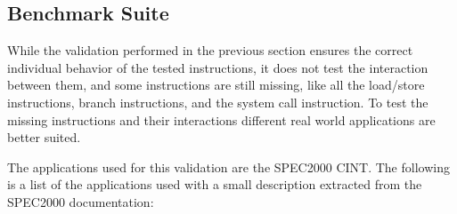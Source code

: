 \subsection{Benchmark Suite}
\label{sec:str7_validation_benchmark_suite}

While the validation performed in the previous section ensures the correct individual behavior of the tested instructions, it does not test the interaction between them, and some instructions are still missing, like all the load/store instructions, branch instructions, and the system call instruction.
To test the missing instructions and their interactions different real world applications are better suited.

The applications used for this validation are the SPEC2000 CINT.
The following is a list of the applications used with a small description extracted from the SPEC2000 documentation:
